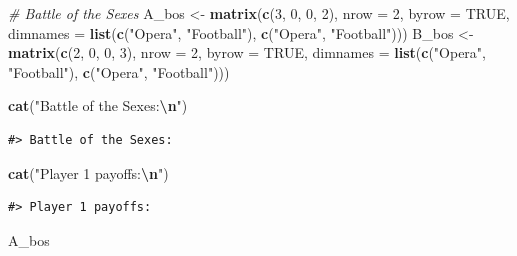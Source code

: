 \documentclass[
]{article}
\newenvironment{Shaded}{\begin{snugshade}}{\end{snugshade}}
\newcommand{\AttributeTok}[1]{\textcolor[rgb]{0.13,0.29,0.53}{#1}}
\newcommand{\CommentTok}[1]{\textcolor[rgb]{0.56,0.35,0.01}{\textit{#1}}}
\newcommand{\ConstantTok}[1]{\textcolor[rgb]{0.56,0.35,0.01}{#1}}
\newcommand{\DecValTok}[1]{\textcolor[rgb]{0.00,0.00,0.81}{#1}}
\newcommand{\FunctionTok}[1]{\textcolor[rgb]{0.13,0.29,0.53}{\textbf{#1}}}
\newcommand{\NormalTok}[1]{#1}
\newcommand{\OtherTok}[1]{\textcolor[rgb]{0.56,0.35,0.01}{#1}}
\newcommand{\SpecialCharTok}[1]{\textcolor[rgb]{0.81,0.36,0.00}{\textbf{#1}}}
\newcommand{\StringTok}[1]{\textcolor[rgb]{0.31,0.60,0.02}{#1}}
\begin{document}
\begin{Shaded}
\begin{Highlighting}[]
\CommentTok{\# Battle of the Sexes}
\NormalTok{A\_bos }\OtherTok{\textless{}{-}} \FunctionTok{matrix}\NormalTok{(}\FunctionTok{c}\NormalTok{(}\DecValTok{3}\NormalTok{, }\DecValTok{0}\NormalTok{, }\DecValTok{0}\NormalTok{, }\DecValTok{2}\NormalTok{), }\AttributeTok{nrow =} \DecValTok{2}\NormalTok{, }\AttributeTok{byrow =} \ConstantTok{TRUE}\NormalTok{,}
                \AttributeTok{dimnames =} \FunctionTok{list}\NormalTok{(}\FunctionTok{c}\NormalTok{(}\StringTok{"Opera"}\NormalTok{, }\StringTok{"Football"}\NormalTok{), }\FunctionTok{c}\NormalTok{(}\StringTok{"Opera"}\NormalTok{, }\StringTok{"Football"}\NormalTok{)))}
\NormalTok{B\_bos }\OtherTok{\textless{}{-}} \FunctionTok{matrix}\NormalTok{(}\FunctionTok{c}\NormalTok{(}\DecValTok{2}\NormalTok{, }\DecValTok{0}\NormalTok{, }\DecValTok{0}\NormalTok{, }\DecValTok{3}\NormalTok{), }\AttributeTok{nrow =} \DecValTok{2}\NormalTok{, }\AttributeTok{byrow =} \ConstantTok{TRUE}\NormalTok{,}
                \AttributeTok{dimnames =} \FunctionTok{list}\NormalTok{(}\FunctionTok{c}\NormalTok{(}\StringTok{"Opera"}\NormalTok{, }\StringTok{"Football"}\NormalTok{), }\FunctionTok{c}\NormalTok{(}\StringTok{"Opera"}\NormalTok{, }\StringTok{"Football"}\NormalTok{)))}

\FunctionTok{cat}\NormalTok{(}\StringTok{"Battle of the Sexes:}\SpecialCharTok{\textbackslash{}n}\StringTok{"}\NormalTok{)}
\end{Highlighting}
\end{Shaded}

\begin{verbatim}
#> Battle of the Sexes:
\end{verbatim}

\begin{Shaded}
\begin{Highlighting}[]
\FunctionTok{cat}\NormalTok{(}\StringTok{"Player 1 payoffs:}\SpecialCharTok{\textbackslash{}n}\StringTok{"}\NormalTok{)}
\end{Highlighting}
\end{Shaded}

\begin{verbatim}
#> Player 1 payoffs:
\end{verbatim}

\begin{Shaded}
\begin{Highlighting}[]
\NormalTok{A\_bos}
\end{Highlighting}
\end{Shaded}
\end{document}
